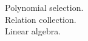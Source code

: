 \documentclass[preview]{standalone}
\begin{document}
Polynomial selection.\\Relation collection.\\Linear algebra.\\
\end{document}
